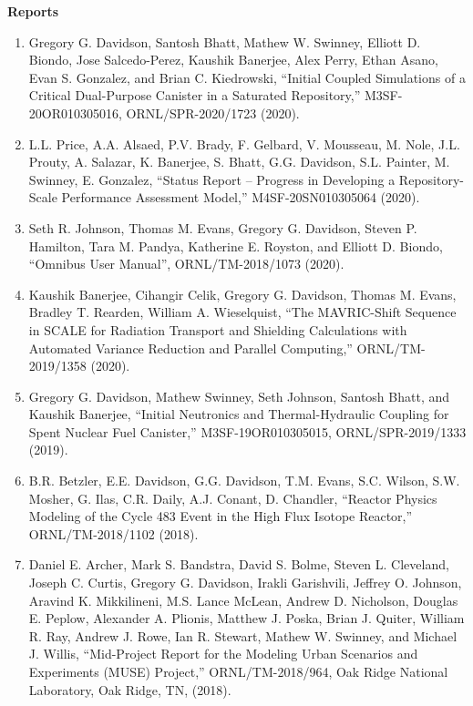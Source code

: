 \documentclass[letterpaper,11pt]{article}
\newcommand{\leftsubheading}[1]{
  \textbf{#1\vspace{-6pt} \\}}
\begin{document}
\leftsubheading{Reports}
\begin{enumerate}
  \item Gregory G. Davidson, Santosh Bhatt, Mathew W. Swinney, Elliott
    D. Biondo, Jose Salcedo-Perez, Kaushik Banerjee, Alex Perry, Ethan
    Asano, Evan S. Gonzalez, and Brian C. Kiedrowski, ``Initial
    Coupled Simulations of a Critical Dual-Purpose Canister in a
    Saturated Repository,'' M3SF-20OR010305016, ORNL/SPR-2020/1723
    (2020). 
  \item L.L. Price, A.A. Alsaed, P.V. Brady, F. Gelbard, V. Mousseau,
    M. Nole, J.L. Prouty, A. Salazar, K. Banerjee, S. Bhatt,
    G.G. Davidson, S.L. Painter, M. Swinney, E. Gonzalez, ``Status
    Report -- Progress in Developing a Repository-Scale Performance
    Assessment Model,'' M4SF-20SN010305064 (2020).
  \item Seth R. Johnson, Thomas M. Evans, Gregory G. Davidson, Steven
    P. Hamilton, Tara M. Pandya, Katherine E. Royston, and Elliott
    D. Biondo, ``Omnibus User Manual'', ORNL/TM-2018/1073 (2020).
  \item Kaushik Banerjee, Cihangir Celik, Gregory G. Davidson,
    Thomas M. Evans, Bradley T. Rearden, William A. Wieselquist,
    ``The MAVRIC-Shift Sequence in SCALE for Radiation Transport and
    Shielding Calculations with Automated Variance Reduction and
    Parallel Computing,'' ORNL/TM-2019/1358 (2020).
  \item Gregory G. Davidson, Mathew Swinney, Seth Johnson, Santosh
    Bhatt, and Kaushik Banerjee, ``Initial Neutronics and
    Thermal-Hydraulic Coupling for Spent Nuclear Fuel Canister,''
    M3SF-19OR010305015, ORNL/SPR-2019/1333 (2019).
  \item B.R. Betzler, E.E. Davidson, G.G. Davidson, T.M. Evans,
    S.C. Wilson, S.W. Mosher, G. Ilas, C.R. Daily, A.J. Conant,
    D. Chandler, ``Reactor Physics Modeling of the Cycle 483 Event
    in the High Flux Isotope Reactor,'' ORNL/TM-2018/1102 (2018).
  \item Daniel E. Archer, Mark S. Bandstra, David S. Bolme, Steven
    L. Cleveland, Joseph C. Curtis, Gregory G. Davidson, Irakli
    Garishvili, Jeffrey O. Johnson, Aravind K. Mikkilineni, M.S. Lance
    McLean, Andrew D. Nicholson, Douglas E. Peplow, Alexander
    A. Plionis, Matthew J. Poska, Brian J. Quiter, William R. Ray,
    Andrew J. Rowe, Ian R. Stewart, Mathew W. Swinney, and Michael
    J. Willis, ``Mid-Project Report for the Modeling Urban Scenarios and
    Experiments (MUSE) Project,'' ORNL/TM-2018/964, Oak Ridge National
    Laboratory, Oak Ridge, TN, (2018).

\end{enumerate}
\end{document}
